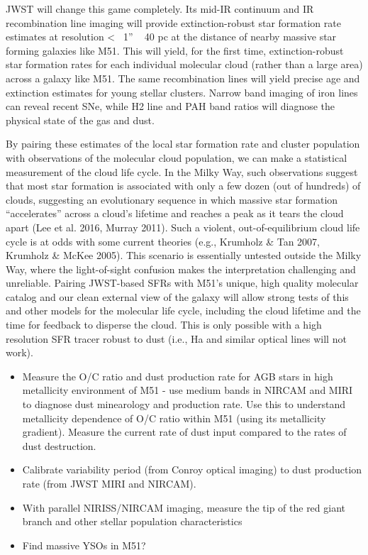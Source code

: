\documentclass[12pt]{article}
\begin{document}
JWST will change this game completely. Its mid-IR continuum and IR recombination line imaging will provide extinction-robust star formation rate estimates at resolution <~ 1” ~ 40 pc at the distance of nearby massive star forming galaxies like M51. This will yield, for the first time, extinction-robust star formation rates for each individual molecular cloud (rather than a large area) across a galaxy like M51. The same recombination lines will yield precise age and extinction estimates for young stellar clusters. Narrow band imaging of iron lines can reveal recent SNe, while H2 line and PAH band ratios will diagnose the physical state of the gas and dust.

By pairing these estimates of the local star formation rate and cluster population with observations of the molecular cloud population, we can make a statistical measurement of the cloud life cycle. In the Milky Way, such observations suggest that most star formation is associated with only a few dozen (out of hundreds) of clouds, suggesting an evolutionary sequence in which massive star formation “accelerates” across a cloud’s lifetime and reaches a peak as it tears the cloud apart (Lee et al. 2016, Murray 2011). Such a violent, out-of-equilibrium cloud life cycle is at odds with some current theories (e.g., Krumholz \& Tan 2007, Krumholz \& McKee 2005). This scenario is essentially untested outside the Milky Way, where the light-of-sight confusion makes the interpretation challenging and unreliable. Pairing JWST-based SFRs with M51’s unique, high quality molecular catalog and our clean external view of the galaxy will allow strong tests of this and other models for the molecular life cycle, including the cloud lifetime and the time for feedback to disperse the cloud. This is only possible with a high resolution SFR tracer robust to dust (i.e., Ha and similar optical lines will not work).




\begin{itemize}
    \item{Measure the O/C ratio and dust production rate for AGB stars in high metallicity environment of M51 - use medium bands in NIRCAM and MIRI to diagnose dust minearology and production rate. Use this to understand metallicity dependence of O/C ratio within M51 (using its metallicity gradient).  Measure the current rate of dust input compared to the rates of dust destruction.}\vspace{-0.1in}
    \item{Calibrate variability period (from Conroy optical imaging) to dust production rate (from JWST MIRI and NIRCAM).}\vspace{-0.1in}
    \item{With parallel NIRISS/NIRCAM imaging, measure the tip of the red giant branch and other stellar population characteristics}\vspace{-0.1in}
    \item{Find massive YSOs in M51?}
\end{itemize}
\end{document}

